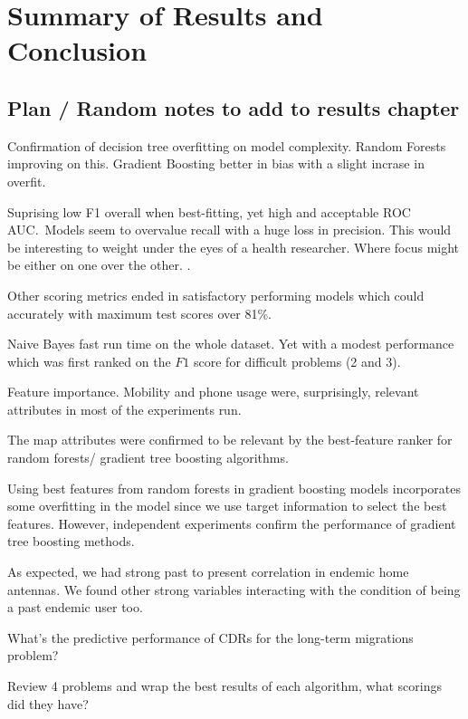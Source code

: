 

\chapter{Summary of Results and Conclusion}\label{ch:results_conclusion}

\section{Plan / Random notes to add to results chapter}

\begin{description}
    \item Confirmation of decision tree overfitting on model complexity. Random Forests improving on this. Gradient Boosting better in bias with a slight incrase in overfit.
    \item Suprising low F1 overall when best-fitting, yet high and acceptable ROC AUC.\ Models seem to overvalue recall with a huge loss in precision. This would be interesting to weight under the eyes of a health researcher. Where focus might be either on one over the other. .
    \item Other scoring metrics ended in satisfactory performing models which could accurately with maximum test scores over 81\%.
    \item Naive Bayes fast run time on the whole dataset. Yet with a modest performance which was first ranked on the $F1$ score for difficult problems (2 and 3).
    \item Feature importance. Mobility and phone usage were, surprisingly, relevant attributes in most of the experiments run.
    \item The map attributes were confirmed to be relevant by the best-feature ranker for random forests/ gradient tree boosting algorithms.
    \item Using best features from random forests in gradient boosting models incorporates some overfitting in the model since we use target information to select the best features. However, independent experiments confirm the performance of gradient tree boosting methods.
    \item As expected, we had strong past to present correlation in endemic home antennas. We found other strong variables interacting with the condition of being a past endemic user too.
    \item What's the predictive performance of CDRs for the long-term migrations problem?
    \item Review 4 problems and wrap the best results of each algorithm, what scorings did they have?


\end{description}


